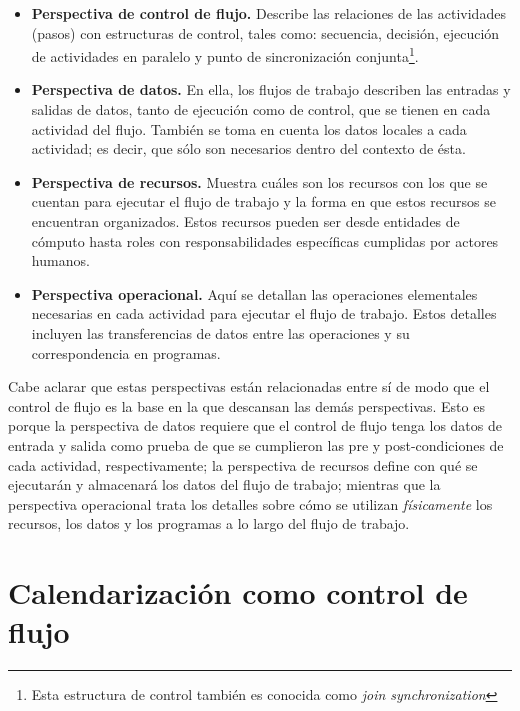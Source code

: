 \begin{itemize}

\item{\textbf{Perspectiva de control de flujo.} Describe las relaciones de las actividades (pasos) con estructuras de control, tales como: secuencia, decisión, ejecución de actividades en paralelo y punto de sincronización conjunta\footnote{Esta estructura de control también es conocida como \emph{join synchronization}}.}

\item{\textbf{Perspectiva de datos.} En ella, los flujos de trabajo describen las entradas y salidas de datos, tanto de ejecución como de control, que se tienen en cada actividad del flujo. También se toma en cuenta los datos locales a cada actividad; es decir, que sólo son necesarios dentro del contexto de ésta.}

\item{\textbf{Perspectiva de recursos.} Muestra cuáles son los recursos con los que se cuentan para ejecutar el flujo de trabajo y la forma en que estos recursos se encuentran organizados. Estos recursos pueden ser desde entidades de cómputo hasta roles con responsabilidades específicas cumplidas por actores humanos.}

\item{\textbf{Perspectiva operacional.} Aquí se detallan las operaciones elementales necesarias en cada actividad para ejecutar el flujo de trabajo. Estos detalles incluyen las transferencias de datos entre las operaciones y su correspondencia en programas.}

\end{itemize}

Cabe aclarar que estas perspectivas están relacionadas entre sí de modo que el control de flujo es la base en la que descansan las demás perspectivas. Esto es porque la perspectiva de datos requiere que el control de flujo tenga los datos de entrada y salida como prueba de que se cumplieron las pre y post-condiciones de cada actividad, respectivamente; la perspectiva de recursos define con qué se ejecutarán y almacenará los datos del flujo de trabajo; mientras que la perspectiva operacional trata los detalles sobre cómo se utilizan \emph{físicamente} los recursos, los datos y los programas a lo largo del flujo de trabajo.

\section{Calendarización como control de flujo}

